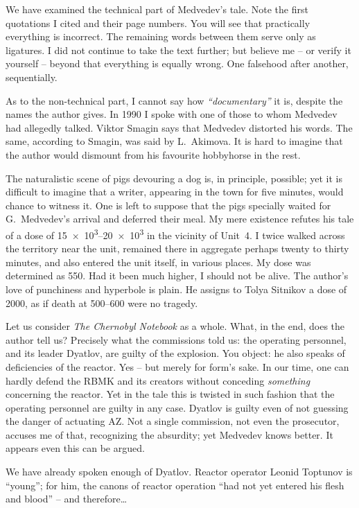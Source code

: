 \documentclass[openright]{bookest}
\begin{document}
We have examined the technical part of Medvedev's tale. Note the first quotations I cited and their page numbers. You will see that practically everything is incorrect. The remaining words between them serve only as ligatures. I did not continue to take the text further; but believe me -- or verify it yourself -- beyond that everything is equally wrong. One falsehood after another, sequentially.

As to the non-technical part, I cannot say how \textit{``documentary''} it is, despite the names the author gives. In 1990 I spoke with one of those to whom Medvedev had allegedly talked. Viktor Smagin says that Medvedev distorted his words. The same, according to Smagin, was said by L.~Akimova. It is hard to imagine that the author would dismount from his favourite hobbyhorse in the rest.

The naturalistic scene of pigs devouring a dog is, in principle, possible; yet it is difficult to imagine that a writer, appearing in the town for five minutes, would chance to witness it. One is left to suppose that the pigs specially waited for G.~Medvedev's arrival and deferred their meal. My mere existence refutes his tale of a dose of \qtyrange{15e3}{20e3}{\roentgen} in the vicinity of Unit~4. I twice walked across the territory near the unit, remained there in aggregate perhaps twenty to thirty minutes, and also entered the unit itself, in various places. My dose was determined as \qty{550}{\rem}. Had it been much higher, I should not be alive. The author's love of punchiness and hyperbole is plain. He assigns to Tolya Sitnikov a dose of \qty{2000}{\rem}, as if death at \qtyrange{500}{600}{\rem} were no tragedy.

Let us consider \textit{The Chernobyl Notebook} as a whole. What, in the end, does the author tell us? Precisely what the commissions told us: the operating personnel, and its leader Dyatlov, are guilty of the explosion. You object: he also speaks of deficiencies of the reactor. Yes -- but merely for form's sake. In our time, one can hardly defend the RBMK and its creators without conceding \textit{something} concerning the reactor. Yet in the tale this is twisted in such fashion that the operating personnel are guilty in any case. Dyatlov is guilty even of not guessing the danger of actuating AZ. Not a single commission, not even the prosecutor, accuses me of that, recognizing the absurdity; yet Medvedev knows better. It appears even this can be argued.

We have already spoken enough of Dyatlov. Reactor operator Leonid Toptunov is ``young''; for him, the canons of reactor operation ``had not yet entered his flesh and blood'' -- and therefore\ldots
\end{document}
